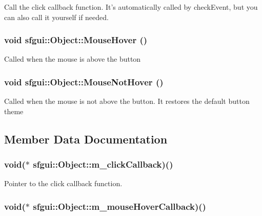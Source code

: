 Call the click callback function. It's automatically called by checkEvent, but you can also call it yourself if needed. \hypertarget{classsfgui_1_1Object_68d1941ad05b3d0bdf2ba85702c04cc0}{
\subsubsection[MouseHover]{\setlength{\rightskip}{0pt plus 5cm}void sfgui::Object::MouseHover ()}}
\label{classsfgui_1_1Object_68d1941ad05b3d0bdf2ba85702c04cc0}




Called when the mouse is above the button \hypertarget{classsfgui_1_1Object_24575661efb4ab88be76eb2e1a4947e6}{
\subsubsection[MouseNotHover]{\setlength{\rightskip}{0pt plus 5cm}void sfgui::Object::MouseNotHover ()}}
\label{classsfgui_1_1Object_24575661efb4ab88be76eb2e1a4947e6}




Called when the mouse is not above the button. It restores the default button theme 

\subsection{Member Data Documentation}
\hypertarget{classsfgui_1_1Object_5917de9750aa3c8d282899ee83f835b4}{
\subsubsection[m\_\-clickCallback]{\setlength{\rightskip}{0pt plus 5cm}void($\ast$ {\bf sfgui::Object::m\_\-clickCallback})()}}
\label{classsfgui_1_1Object_5917de9750aa3c8d282899ee83f835b4}


Pointer to the click callback function. 

\hypertarget{classsfgui_1_1Object_ddff61a2d47a7b25e05aa5b6311417ea}{
\subsubsection[m\_\-mouseHoverCallback]{\setlength{\rightskip}{0pt plus 5cm}void($\ast$ {\bf sfgui::Object::m\_\-mouseHoverCallback})()}}
\label{classsfgui_1_1Object_ddff61a2d47a7b25e05aa5b6311417ea}


